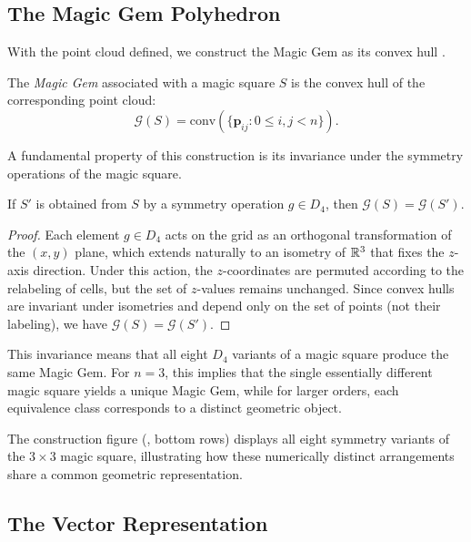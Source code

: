 \subsection{The Magic Gem Polyhedron}

With the point cloud defined, we construct the Magic Gem as its convex hull \cite{barvinok2002course}.

\begin{definition}
The \emph{Magic Gem} associated with a magic square $S$ is the convex hull of the corresponding point cloud:
\[
\mathcal{G}(S) = \text{conv}\left( \{ \mathbf{p}_{ij} : 0 \leq i, j < n \} \right).
\]
\end{definition}

A fundamental property of this construction is its invariance under the symmetry operations of the magic square.

\begin{proposition}
\label{prop:symmetry_invariance}
If $S'$ is obtained from $S$ by a symmetry operation $g \in D_4$, then $\mathcal{G}(S) = \mathcal{G}(S')$.
\end{proposition}

\begin{proof}
Each element $g \in D_4$ acts on the grid as an orthogonal transformation of the $(x, y)$ plane,
which extends naturally to an isometry of $\mathbb{R}^3$ that fixes the $z$-axis direction.
Under this action, the $z$-coordinates are permuted according to the relabeling of cells,
but the set of $z$-values remains unchanged.
Since convex hulls are invariant under isometries and depend only on the set of points (not their labeling),
we have $\mathcal{G}(S) = \mathcal{G}(S')$.
\end{proof}

This invariance means that all eight $D_4$ variants of a magic square produce the same Magic Gem.
For $n = 3$, this implies that the single essentially different magic square yields a unique Magic Gem,
while for larger orders, each equivalence class corresponds to a distinct geometric object.

The construction figure (, bottom rows) displays all eight symmetry variants of the $3 \times 3$ magic square,
illustrating how these numerically distinct arrangements share a common geometric representation.

\subsection{The Vector Representation}
\label{sec:vector_rep}

